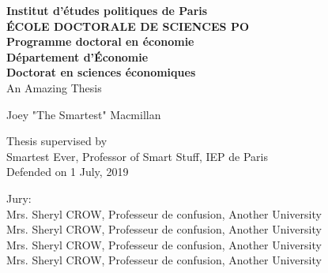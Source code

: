 \begin{titlepage}
\begin{center}
    \vspace*{1cm}

    \Large
    \textbf{Institut d'\'etudes politiques de Paris}\\
    \textbf{\'ECOLE DOCTORALE DE SCIENCES PO}\\
    \textbf{Programme doctoral en \'economie}\\
    \textbf{D\'epartement d'\'Economie}\\
    \textbf{Doctorat en sciences \'economiques}\\

    \vspace{1.5cm}
    \Huge
    An Amazing Thesis


    \vspace{0.5cm}
    \Large
    Joey "The Smartest" Macmillan

    \vfill

    Thesis supervised by\\
     Smartest Ever, Professor of Smart Stuff, IEP de Paris\\
    Defended on 1 July, 2019

    \vspace{0.8cm}


\large

\noindent Jury:\\
\hspace{-0.0cm}Mrs. Sheryl CROW, Professeur de confusion, Another University\\
\hspace{-0.0cm}Mrs. Sheryl CROW, Professeur de confusion, Another University\\
\hspace{-0.0cm}Mrs. Sheryl CROW, Professeur de confusion, Another University\\
\hspace{-0.0cm}Mrs. Sheryl CROW, Professeur de confusion, Another University\\
\end{center}
\end{titlepage}

\setcounter{page}{2}
